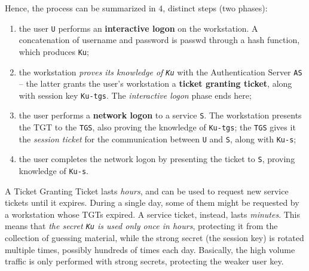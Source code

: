 \documentclass[10pt]{extbook}
\begin{document}
Hence, the process can be summarized in $4$, distinct steps (two phases):
\begin{enumerate}
    \item the user \texttt{U} performs an \textbf{interactive logon} on the
        workstation. A concatenation of username and password is passwd through
        a hash function, which produces \texttt{Ku};
    \item the workstation \emph{proves its knowledge of \texttt{Ku}} with the
        Authentication Server \texttt{AS} -- the latter grants the user's
        workstation a \textbf{ticket granting ticket}, along with session key
        \texttt{Ku-tgs}. The \emph{interactive logon} phase ends here;
    \item the user performs a \textbf{network logon} to a service \texttt{S}.
        The workstation presents the TGT to the \texttt{TGS}, also proving the
        knowledge of \texttt{Ku-tgs}; the \texttt{TGS} gives it the
        \emph{session ticket} for the communication between \texttt{U} and
        \texttt{S}, along with \texttt{Ku-s};
    \item the user completes the network logon by presenting the ticket to
        \texttt{S}, proving knowledge of \texttt{Ku-s}.
\end{enumerate}

A Ticket Granting Ticket lasts \emph{hours}, and can be used to request new
service tickets until it expires. During a single day, some of them might be
requested by a workstation whose TGTs expired. A service ticket, instead, lasts
\emph{minutes}. This means that \emph{the secret \texttt{Ku} is used only once
in hours}, protecting it from the collection of guessing material, while the
strong secret (the session key) is rotated multiple times, possibly hundreds of
times each day. Basically, the high volume traffic is only performed with
strong secrets, protecting the weaker user key.
\end{document}
